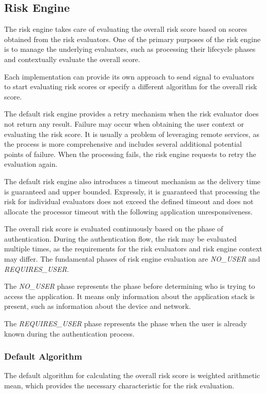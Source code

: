 \newpage
\subsection{Risk Engine} \label{risk-engine}
The risk engine takes care of evaluating the overall risk score based on scores obtained from the risk evaluators.
One of the primary purposes of the risk engine is to manage the underlying evaluators, such as processing their lifecycle phases and contextually evaluate the overall score.

Each implementation can provide its own approach to send signal to evaluators to start evaluating risk scores or specify a different algorithm for the overall risk score.

The default risk engine provides a retry mechanism when the risk evaluator does not return any result.
Failure may occur when obtaining the user context or evaluating the risk score.
It is usually a problem of leveraging remote services, as the process is more comprehensive and includes several additional potential points of failure.
When the processing fails, the risk engine requests to retry the evaluation again.

The default risk engine also introduces a timeout mechanism as the delivery time is guaranteed and upper bounded.
Expressly, it is guaranteed that processing the risk for individual evaluators does not exceed the defined timeout and does not allocate the processor timeout with the following application unresponsiveness.

The overall risk score is evaluated continuously based on the phase of authentication.
During the authentication flow, the risk may be evaluated multiple times, as the requirements for the risk evaluators and risk engine context may differ.
The fundamental phases of risk engine evaluation are \textit{NO\_USER} and \textit{REQUIRES\_USER}. 

The \textit{NO\_USER} phase represents the phase before determining who is trying to access the application.
It means only information about the application stack is present, such as information about the device and network.

The \textit{REQUIRES\_USER} phase represents the phase when the user is already known during the authentication process.

\subsubsection{Default Algorithm}
The default algorithm for calculating the overall risk score is weighted arithmetic mean, which provides the necessary characteristic for the risk evaluation.

